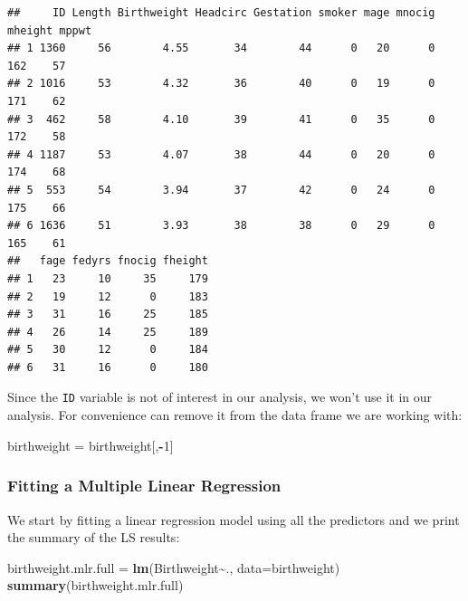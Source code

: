 \documentclass[
]{book}
\newenvironment{Shaded}{\begin{snugshade}}{\end{snugshade}}
\newcommand{\AttributeTok}[1]{\textcolor[rgb]{0.13,0.29,0.53}{#1}}
\newcommand{\DecValTok}[1]{\textcolor[rgb]{0.00,0.00,0.81}{#1}}
\newcommand{\FunctionTok}[1]{\textcolor[rgb]{0.13,0.29,0.53}{\textbf{#1}}}
\newcommand{\NormalTok}[1]{#1}
\newcommand{\OtherTok}[1]{\textcolor[rgb]{0.56,0.35,0.01}{#1}}
\newcommand{\SpecialCharTok}[1]{\textcolor[rgb]{0.81,0.36,0.00}{\textbf{#1}}}
\begin{document}
\begin{verbatim}
##     ID Length Birthweight Headcirc Gestation smoker mage mnocig mheight mppwt
## 1 1360     56        4.55       34        44      0   20      0     162    57
## 2 1016     53        4.32       36        40      0   19      0     171    62
## 3  462     58        4.10       39        41      0   35      0     172    58
## 4 1187     53        4.07       38        44      0   20      0     174    68
## 5  553     54        3.94       37        42      0   24      0     175    66
## 6 1636     51        3.93       38        38      0   29      0     165    61
##   fage fedyrs fnocig fheight
## 1   23     10     35     179
## 2   19     12      0     183
## 3   31     16     25     185
## 4   26     14     25     189
## 5   30     12      0     184
## 6   31     16      0     180
\end{verbatim}

Since the \texttt{ID} variable is not of interest in our analysis, we won't use it in our analysis. For convenience can remove it from the data frame we are working with:

\begin{Shaded}
\begin{Highlighting}[]
\NormalTok{birthweight }\OtherTok{=}\NormalTok{ birthweight[,}\SpecialCharTok{{-}}\DecValTok{1}\NormalTok{]}
\end{Highlighting}
\end{Shaded}

\subsubsection{Fitting a Multiple Linear Regression}\label{fitting-a-multiple-linear-regression}

We start by fitting a linear regression model using all the predictors and we print the summary of the LS results:

\begin{Shaded}
\begin{Highlighting}[]
\NormalTok{birthweight.mlr.full }\OtherTok{=} \FunctionTok{lm}\NormalTok{(Birthweight}\SpecialCharTok{\textasciitilde{}}\NormalTok{., }\AttributeTok{data=}\NormalTok{birthweight)}
\FunctionTok{summary}\NormalTok{(birthweight.mlr.full)}
\end{Highlighting}
\end{Shaded}
\end{document}

